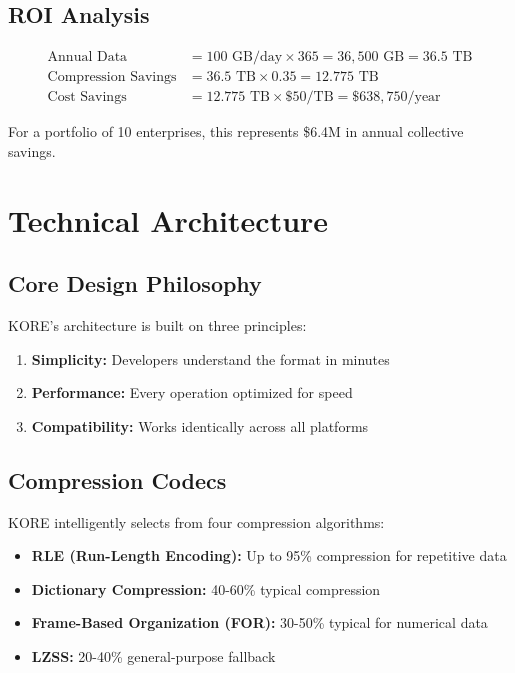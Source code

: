 \documentclass{article}
\begin{document}
\subsection*{ROI Analysis}

\begin{align*}
\text{Annual Data} &= 100 \text{ GB/day} \times 365 = 36,500 \text{ GB} = 36.5 \text{ TB} \\
\text{Compression Savings} &= 36.5 \text{ TB} \times 0.35 = 12.775 \text{ TB} \\
\text{Cost Savings} &= 12.775 \text{ TB} \times \$50/\text{TB} = \$638,750/\text{year}
\end{align*}

For a portfolio of 10 enterprises, this represents \$6.4M in annual collective savings.

\section*{Technical Architecture}

\subsection*{Core Design Philosophy}

KORE's architecture is built on three principles:

\begin{enumerate}
    \item \textbf{Simplicity:} Developers understand the format in minutes
    \item \textbf{Performance:} Every operation optimized for speed
    \item \textbf{Compatibility:} Works identically across all platforms
\end{enumerate}

\subsection*{Compression Codecs}

KORE intelligently selects from four compression algorithms:

\begin{itemize}
    \item \textbf{RLE (Run-Length Encoding):} Up to 95\% compression for repetitive data
    \item \textbf{Dictionary Compression:} 40-60\% typical compression
    \item \textbf{Frame-Based Organization (FOR):} 30-50\% typical for numerical data
    \item \textbf{LZSS:} 20-40\% general-purpose fallback
\end{itemize}
\end{document}
